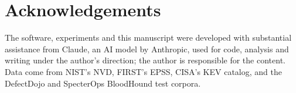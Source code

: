 \documentclass[11pt]{article}
\begin{document}
\section*{Acknowledgements}

The software, experiments and this manuscript were developed with substantial assistance from Claude, an AI model by
Anthropic, used for code, analysis and writing under the author's direction; the author is responsible for the
content. Data come from NIST's NVD, FIRST's EPSS, CISA's KEV catalog, and the DefectDojo and SpecterOps BloodHound
test corpora.



\end{document}
